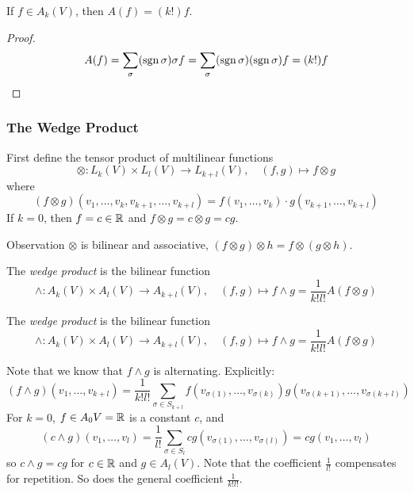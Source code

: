 \begin{frame}
  \begin{lemma}
    If $f \in A_k(V)$, then $A(f) = (k!)f$.
  \end{lemma}
  \begin{proof}
    \begin{displaymath}
      A(f) = \sum_{\sigma} (\operatorname{sgn} \sigma) \sigma f =
      \sum_{\sigma} (\operatorname{sgn} \sigma) (\operatorname{sgn} \sigma) f = (k!) f
    \end{displaymath}
  \end{proof}
\end{frame}
\begin{frame}
  \frametitle{The Wedge Product}
  First define the tensor product of multilinear functions
  \begin{displaymath}
    \otimes \colon L_k(V) \times L_l(V) \to L_{k+l}(V),
    \quad (f, g) \mapsto f \otimes g
  \end{displaymath}
  where
  \begin{displaymath}
    (f \otimes g)(v_1, \dots, v_k, v_{k+1}, \dots, v_{k+l}) = 
    f(v_1, \dots, v_k) \cdot 
    g(v_{k+1}, \dots, v_{k+l})
  \end{displaymath}
  If $k = 0$, then $f = c \in \mathbb R$ and $f \otimes g = c \otimes g = cg$.
  \begin{block}
    {Observation}
    $\otimes$ is bilinear and associative, $(f \otimes g) \otimes h =
    f \otimes (g \otimes h)$.
  \end{block}
  \begin{definition}
    The {\em wedge product} is the bilinear function
    \begin{displaymath}
      \wedge \colon A_k(V) \times A_l(V) \to A_{k+l}(V), \quad
      (f, g) \mapsto f \wedge g = \frac{1}{k! l!}A(f \otimes g)
    \end{displaymath}
  \end{definition}
\end{frame}
\begin{frame}
  \begin{definition}
    The {\em wedge product} is the bilinear function
    \begin{displaymath}
      \wedge \colon A_k(V) \times A_l(V) \to A_{k+l}(V), \quad
      (f, g) \mapsto f \wedge g = \frac{1}{k! l!}A(f \otimes g)
    \end{displaymath}
  \end{definition}
  Note that we know that $f \wedge g$ is alternating.
  Explicitly:
  \begin{displaymath}
    (f \wedge g)(v_1, \dots, v_{k+l}) =
    \frac{1}{k!l!} \sum_{\sigma \in S_{k+l}}
    f(v_{\sigma(1)}, \dots, v_{\sigma(k)})
    g(v_{\sigma(k+1)}, \dots, v_{\sigma(k+l)})
  \end{displaymath}
  For $k = 0$, $f \in A_0V = \mathbb R$ is a constant $c$, and
  \begin{displaymath}
    (c \wedge g)(v_1, \dots, v_l) = \frac{1}{l!} 
    \sum_{\sigma \in S_l} cg(v_{\sigma(1)}, \dots, v_{\sigma(l)}) =
    cg(v_1, \dots, v_l)
  \end{displaymath}
  so $c \wedge g = cg$ for $c \in \mathbb R$ and $g \in A_l(V)$.
  Note that the coefficient $\frac{1}{l!}$ compensates for repetition. 
  So does the general coefficient $\frac{1}{k!l!}$.
\end{frame}
